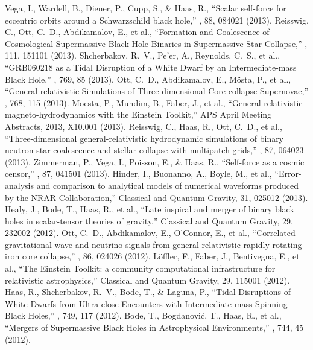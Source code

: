  Vega, I., Wardell, B., Diener, P., Cupp, S., \& Haas, R., ``Scalar self-force for eccentric orbits around a Schwarzschild black hole,'' \prd, 88, 084021 (2013).
 Reisswig, C., Ott, C.~D., Abdikamalov, E., et al., ``Formation and Coalescence of Cosmological Supermassive-Black-Hole Binaries in Supermassive-Star Collapse,'' \prl, 111, 151101 (2013).
 Shcherbakov, R.~V., Pe'er, A., Reynolds, C.~S., et al., ``GRB060218 as a Tidal Disruption of a White Dwarf by an Intermediate-mass Black Hole,'' \apj, 769, 85 (2013).
 Ott, C.~D., Abdikamalov, E., M{\"o}sta, P., et al., ``General-relativistic Simulations of Three-dimensional Core-collapse Supernovae,'' \apj, 768, 115 (2013).
 Moesta, P., Mundim, B., Faber, J., et al., ``General relativistic magneto-hydrodynamics with the Einstein Toolkit,'' APS April Meeting Abstracts, 2013, X10.001 (2013).
 Reisswig, C., Haas, R., Ott, C.~D., et al., ``Three-dimensional general-relativistic hydrodynamic simulations of binary neutron star coalescence and stellar collapse with multipatch grids,'' \prd, 87, 064023 (2013).
 Zimmerman, P., Vega, I., Poisson, E., \& Haas, R., ``Self-force as a cosmic censor,'' \prd, 87, 041501 (2013).
 Hinder, I., Buonanno, A., Boyle, M., et al., ``Error-analysis and comparison to analytical models of numerical waveforms produced by the NRAR Collaboration,'' Classical and Quantum Gravity, 31, 025012 (2013).
 Healy, J., Bode, T., Haas, R., et al., ``Late inspiral and merger of binary black holes in scalar-tensor theories of gravity,'' Classical and Quantum Gravity, 29, 232002 (2012).
 Ott, C.~D., Abdikamalov, E., O'Connor, E., et al., ``Correlated gravitational wave and neutrino signals from general-relativistic rapidly rotating iron core collapse,'' \prd, 86, 024026 (2012).
 L{\"o}ffler, F., Faber, J., Bentivegna, E., et al., ``The Einstein Toolkit: a community computational infrastructure for relativistic astrophysics,'' Classical and Quantum Gravity, 29, 115001 (2012).
 Haas, R., Shcherbakov, R.~V., Bode, T., \& Laguna, P., ``Tidal Disruptions of White Dwarfs from Ultra-close Encounters with Intermediate-mass Spinning Black Holes,'' \apj, 749, 117 (2012).
 Bode, T., Bogdanovi{\'c}, T., Haas, R., et al., ``Mergers of Supermassive Black Holes in Astrophysical Environments,'' \apj, 744, 45 (2012).
